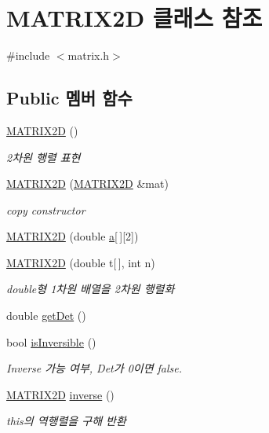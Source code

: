 \hypertarget{class_m_a_t_r_i_x2_d}{\section{M\-A\-T\-R\-I\-X2\-D 클래스 참조}
\label{class_m_a_t_r_i_x2_d}
}


{\ttfamily \#include $<$matrix.\-h$>$}

\subsection*{Public 멤버 함수}
\begin{DoxyCompactItemize}
\item 
\hyperlink{class_m_a_t_r_i_x2_d_a34e47a9c3d3006372f43d1f593a253df}{M\-A\-T\-R\-I\-X2\-D} ()
\begin{DoxyCompactList}\small\item\em 2차원 행렬 표현 \end{DoxyCompactList}\item 
\hyperlink{class_m_a_t_r_i_x2_d_a47149410e6e90d06ceb211eec22ee822}{M\-A\-T\-R\-I\-X2\-D} (\hyperlink{class_m_a_t_r_i_x2_d}{M\-A\-T\-R\-I\-X2\-D} \&mat)
\begin{DoxyCompactList}\small\item\em copy constructor \end{DoxyCompactList}\item 
\hyperlink{class_m_a_t_r_i_x2_d_aacd4a6b2603c7d34c08da1ddf118ab19}{M\-A\-T\-R\-I\-X2\-D} (double \hyperlink{class_m_a_t_r_i_x2_d_a4ae1e61f3b886f9b3ce346f6d54de973}{a}\mbox{[}$\,$\mbox{]}\mbox{[}2\mbox{]})
\item 
\hyperlink{class_m_a_t_r_i_x2_d_a5b4703886bd5d30d4bc47fff85488b04}{M\-A\-T\-R\-I\-X2\-D} (double t\mbox{[}$\,$\mbox{]}, int n)
\begin{DoxyCompactList}\small\item\em double형 1차원 배열을 2차원 행렬화 \end{DoxyCompactList}\item 
double \hyperlink{class_m_a_t_r_i_x2_d_a0c4cad4dbb6ad4a5a560d4c9876cd071}{get\-Det} ()
\item 
bool \hyperlink{class_m_a_t_r_i_x2_d_ae5018742fa0dfa84dbb2466c0789bdcd}{is\-Inversible} ()
\begin{DoxyCompactList}\small\item\em Inverse 가능 여부, Det가 0이면 false. \end{DoxyCompactList}\item 
\hyperlink{class_m_a_t_r_i_x2_d}{M\-A\-T\-R\-I\-X2\-D} \hyperlink{class_m_a_t_r_i_x2_d_a8593d4fd11d45ea256047900ebc77307}{inverse} ()
\begin{DoxyCompactList}\small\item\em this의 역행렬을 구해 반환 \end{DoxyCompactList}\end{DoxyCompactItemize}
